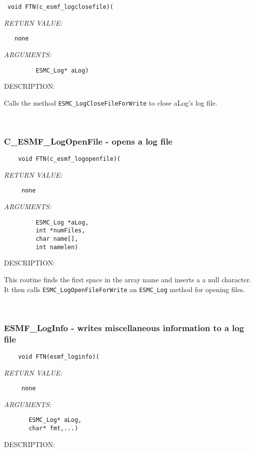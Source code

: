   
\begin{verbatim} 
 void FTN(c_esmf_logclosefile)(\end{verbatim}{\em RETURN VALUE:}
\begin{verbatim}   none\end{verbatim}{\em ARGUMENTS:}
\begin{verbatim}         ESMC_Log* aLog)\end{verbatim}
{\sf DESCRIPTION:\\ }


   Calls the method {\tt ESMC\_LogCloseFileForWrite} to close aLog's 
   log file.
   
 
\mbox{}\hrulefill\ 
 

  \subsubsection [C\_ESMF\_LogOpenFile] {C\_ESMF\_LogOpenFile - opens a log file}


\begin{verbatim}    void FTN(c_esmf_logopenfile)(\end{verbatim}{\em RETURN VALUE:}
\begin{verbatim}     none\end{verbatim}{\em ARGUMENTS:}
\begin{verbatim}         ESMC_Log *aLog, 
         int *numFiles, 
         char name[], 
         int namelen)\end{verbatim}
{\sf DESCRIPTION:\\ }


   This routine finds the first space in the array name and inserts a
   a null character. It then calls {\tt ESMC\_LogOpenFileForWrite} 
   an {\tt ESMC\_Log} method for opening files. 
 
\mbox{}\hrulefill\ 
 
\subsubsection [ESMF\_LogInfo] {ESMF\_LogInfo - writes miscellaneous information to a log file}


  
\begin{verbatim}    void FTN(esmf_loginfo)(\end{verbatim}{\em RETURN VALUE:}
\begin{verbatim}     none\end{verbatim}{\em ARGUMENTS:}
\begin{verbatim}       ESMC_Log* aLog,
       char* fmt,...)\end{verbatim}
{\sf DESCRIPTION:\\ }


